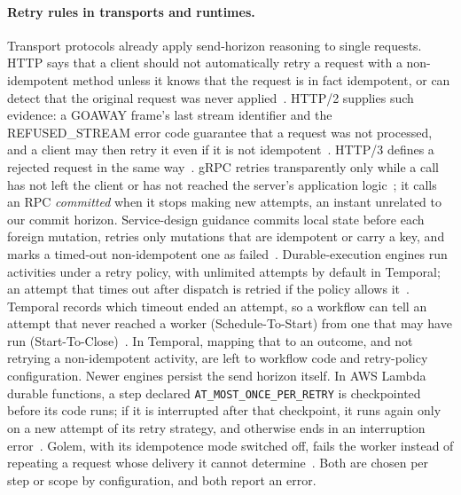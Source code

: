 \documentclass[11pt]{article}
\theoremstyle{definition}
\theoremstyle{plain}
\begin{document}
\paragraph{Retry rules in transports and runtimes.} Transport protocols already apply send-horizon reasoning to single requests. HTTP says that a client should not automatically retry a request with a non-idempotent method unless it knows that the request is in fact idempotent, or can detect that the original request was never applied~\citep[Sec.~9.2.2]{rfc9110}. HTTP/2 supplies such evidence: a GOAWAY frame's last stream identifier and the REFUSED\_STREAM error code guarantee that a request was not processed, and a client may then retry it even if it is not idempotent~\citep[Sec.~8.7]{rfc9113}. HTTP/3 defines a rejected request in the same way~\citep[Sec.~4.1.1]{rfc9114}. gRPC retries transparently only while a call has not left the client or has not reached the server's application logic~\citep{grpcA6}; it calls an RPC \emph{committed} when it stops making new attempts, an instant unrelated to our commit horizon. Service-design guidance commits local state before each foreign mutation, retries only mutations that are idempotent or carry a key, and marks a timed-out non-idempotent one as failed~\citep{Leach2017Idempotency}. Durable-execution engines run activities under a retry policy, with unlimited attempts by default in Temporal; an attempt that times out after dispatch is retried if the policy allows it~\citep{TemporalRetry,TemporalTimeouts}. Temporal records which timeout ended an attempt, so a workflow can tell an attempt that never reached a worker (Schedule-To-Start) from one that may have run (Start-To-Close)~\citep{TemporalTimeouts,TemporalEvents}. In Temporal, mapping that to an outcome, and not retrying a non-idempotent activity, are left to workflow code and retry-policy configuration. Newer engines persist the send horizon itself. In AWS Lambda durable functions, a step declared \texttt{AT\_MOST\_ONCE\_PER\_RETRY} is checkpointed before its code runs; if it is interrupted after that checkpoint, it runs again only on a new attempt of its retry strategy, and otherwise ends in an interruption error~\citep{AWSDurableSteps}. Golem, with its idempotence mode switched off, fails the worker instead of repeating a request whose delivery it cannot determine~\citep{GolemDurability}. Both are chosen per step or scope by configuration, and both report an error.
\end{document}
